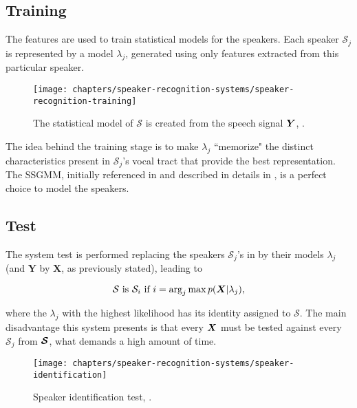 \subsection{Training}

The features are used to train statistical models for the speakers. Each speaker $\mathcal{S}_j$ is represented by a model $\lambda_j$, generated using only features extracted from this particular speaker.

\begin{figure}[ht]
    \centering
    \texttt{[image: chapters/speaker-recognition-systems/speaker-recognition-training]}
    \caption{The statistical model of $\mathcal{S}$ is created from the speech signal $\boldsymbol{Y}$, .}
    \label{fig:speaker-recognition-training}
\end{figure}

The idea behind the training stage is to make $\lambda_j$ ``memorize" the distinct characteristics present in $\mathcal{S}_j$'s vocal tract that provide the best representation. The SSGMM, initially referenced in  and described in details in , is a perfect choice to model the speakers.

\subsection{Test}

The system test is performed replacing the speakers $\mathcal{S}_j$'s in  by their models $\lambda_j$ (and $\boldsymbol{Y}$ by $\boldsymbol{X}$, as previously stated), leading to

\begin{equation}
    \mathcal{S} \text{ is } \mathcal{S}_i \text{ if } i = \arg_j\max\postpdf{\boldsymbol{X}}{\lambda_j},
    \label{eq:speaker_identification}
\end{equation}

\noindent where the $\lambda_j$ with the highest likelihood has its identity assigned to $\mathcal{S}$. The main disadvantage this system presents is that every $\boldsymbol{X}$ must be tested against every $\mathcal{S}_j$ from $\boldsymbol{\mathcal{S}}$, what demands a high amount of time.

\begin{figure}[ht]
    \centering
    \texttt{[image: chapters/speaker-recognition-systems/speaker-identification]}
    \caption{Speaker identification test, .}
    \label{fig:speaker_identification}
\end{figure}

